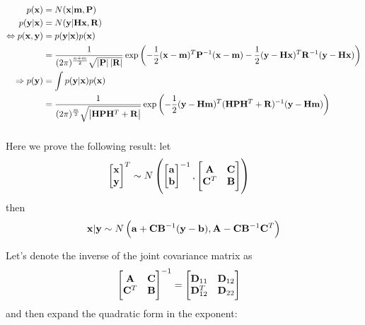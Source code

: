 \documentclass[a4paper,oneside,article]{memoir}
\begin{document}
\begin{align}
	p(\mathbf{x})&=N(\mathbf{x}|\mathbf{m},\mathbf{P})\\
	p(\mathbf{y}|\mathbf{x})&=N(\mathbf{y}|\mathbf{H}\mathbf{x},\mathbf{R})\\
	\Leftrightarrow p(\mathbf{x},\mathbf{y})&=p(\mathbf{y}|\mathbf{x})p(\mathbf{x})\\
	&=\frac{1}{(2\pi)^{\frac{n+m}{2}}\sqrt{\left| \mathbf{P} \right|\left| \mathbf{R} \right|}}\exp\left(-\frac{1}{2}(\mathbf{x}-\mathbf{m})^T\mathbf{P}^{-1}(\mathbf{x}-\mathbf{m})-\frac{1}{2}(\mathbf{y}-\mathbf{H}\mathbf{x})^T\mathbf{R}^{-1}(\mathbf{y}-\mathbf{H}\mathbf{x})\right)\\
	\Rightarrow p(\mathbf{y}) &= \int p(\mathbf{y}|\mathbf{x})p(\mathbf{x})\\
	&=\frac{1}{(2\pi)^{\frac{m}{2}}\sqrt{\left| \mathbf{H}\mathbf{P}\mathbf{H}^T+\mathbf{R} \right|}}\exp\left(-\frac{1}{2}(\mathbf{y}-\mathbf{H}\mathbf{m})^T(\mathbf{H}\mathbf{P}\mathbf{H}^T+\mathbf{R})^{-1}(\mathbf{y}-\mathbf{H}\mathbf{m})\right)\\
\end{align}

\subsubsection{}

Here we prove the following result:
let 
\begin{align}
	\begin{bmatrix}
		\mathbf{x}\\
		\mathbf{y}
	\end{bmatrix}^T
	&\sim
	N\left(
	\begin{bmatrix}
		\mathbf{a}\\
		\mathbf{b}
	\end{bmatrix}^{-1},
	\begin{bmatrix}
		\mathbf{A} & \mathbf{C} \\
		\mathbf{C}^T & \mathbf{B}
	\end{bmatrix}
	\right)		
\end{align}
then
\begin{align}
	\mathbf{x}|\mathbf{y}\sim N\left(\mathbf{a}+\mathbf{C}\mathbf{B}^{-1}(\mathbf{y}-\mathbf{b}),\mathbf{A}-\mathbf{C}\mathbf{B}^{-1}\mathbf{C}^T\right)
\end{align}

Let's denote the inverse of the joint covariance matrix as
\begin{align}
		\begin{bmatrix}
		\mathbf{A} & \mathbf{C} \\
		\mathbf{C}^T & \mathbf{B}
		\end{bmatrix}^{-1}&=
		\begin{bmatrix}
		\mathbf{D}_{11} & \mathbf{D}_{12} \\
		\mathbf{D}_{12}^T & \mathbf{D}_{22}
		\end{bmatrix}
\end{align}
and then expand the quadratic form in the exponent:
\end{document}
